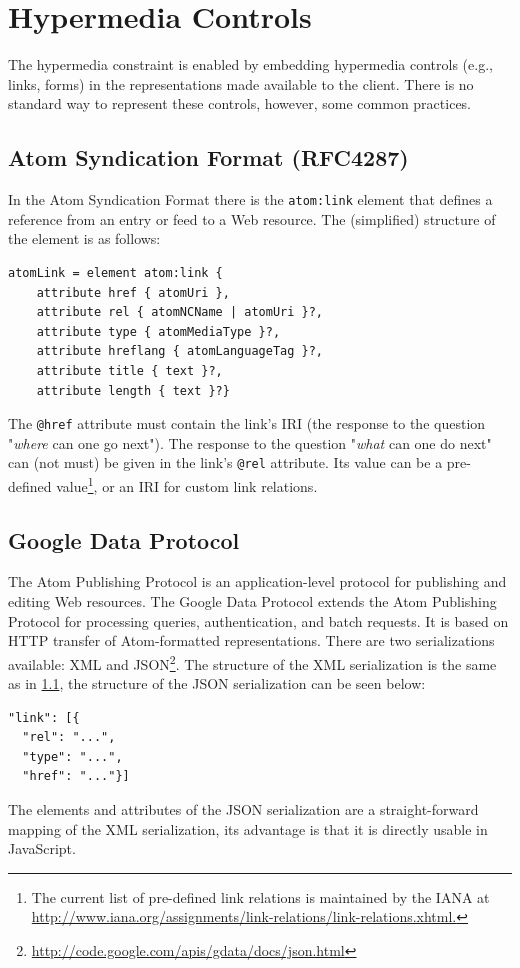 \documentclass{acm_proc_article-sp}
\begin{document}
\section{Hypermedia Controls}\label{sec:currenthateoas}
The hypermedia constraint is enabled by embedding hypermedia controls (e.g., links, forms) in the representations made available to the client. There is no standard way to represent these controls, however, some common practices.

\subsection{Atom Syndication Format (RFC4287)}\label{sec:atom}
In the Atom Syndication Format \cite{Atom:Synd} there is the \texttt{atom:link} element that defines a reference from an entry or feed to a Web resource. The (simplified) structure of the element is as follows:
\begin{verbatim}
atomLink = element atom:link {
    attribute href { atomUri },
    attribute rel { atomNCName | atomUri }?,
    attribute type { atomMediaType }?,
    attribute hreflang { atomLanguageTag }?,
    attribute title { text }?,
    attribute length { text }?}
\end{verbatim}
The \texttt{@href} attribute must contain the link's IRI (the response to the question "\textit{where} can one go next"). The response to the question "\textit{what} can one do next" can (not must) be given in the link's \texttt{@rel} attribute. Its value can be a pre-defined value\footnote{The current list of pre-defined link relations is maintained by the IANA at \url{http://www.iana.org/assignments/link-relations/link-relations.xhtml.}}, or an IRI for custom link relations.

\subsection{Google Data Protocol}\label{sec:gdata}
The Atom Publishing Protocol\cite{Atom:Pub} is an application-level protocol for publishing and editing Web resources. The Google Data Protocol\cite{Google:Data} extends the Atom Publishing Protocol for processing queries, authentication, and batch requests. It is based on HTTP transfer of Atom-formatted representations. There are two serializations available: XML and JSON\footnote{\url{http://code.google.com/apis/gdata/docs/json.html}}. The structure of the XML serialization is the same as in \ref{sec:atom}, the structure of the JSON serialization can be seen below:
\begin{verbatim}
"link": [{
  "rel": "...",
  "type": "...",
  "href": "..."}]
\end{verbatim}
The elements and attributes of the JSON serialization are a straight-forward mapping of the XML serialization, its advantage is that it is directly usable in JavaScript.
\end{document}
